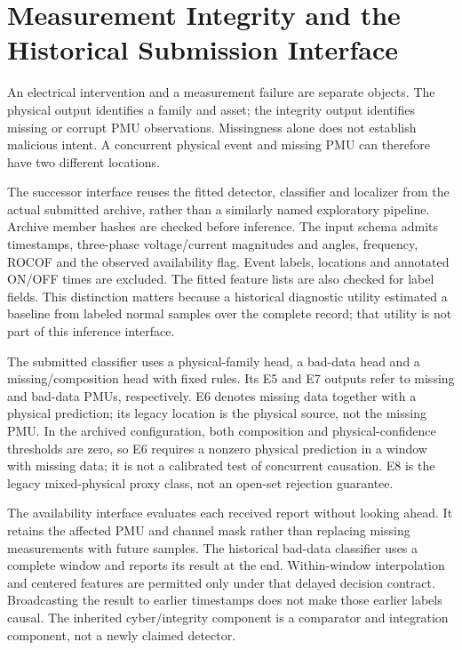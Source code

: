 \section{Measurement Integrity and the Historical Submission Interface}
\label{app:integrity-interface}

An electrical intervention and a measurement failure are separate objects.
The physical output identifies a family and asset; the integrity output
identifies missing or corrupt PMU observations. Missingness alone does not
establish malicious intent. A concurrent physical event and missing PMU can
therefore have two different locations.

The successor interface reuses the fitted detector, classifier and localizer
from the actual submitted archive, rather than a similarly named exploratory
pipeline. Archive member hashes are checked before inference. The input
schema admits timestamps, three-phase voltage/current magnitudes and angles,
frequency, ROCOF and the observed availability flag. Event labels, locations
and annotated ON/OFF times are excluded. The fitted feature lists are also
checked for label fields. This distinction matters because a historical
diagnostic utility estimated a baseline from labeled normal samples over
the complete record; that utility is not part of this inference interface.

The submitted classifier uses a physical-family head, a bad-data head and a
missing/composition head with fixed rules. Its E5 and E7 outputs refer to
missing and bad-data PMUs, respectively. E6 denotes missing data together
with a physical prediction; its legacy location is the physical source,
not the missing PMU. In the archived configuration, both composition and
physical-confidence thresholds are zero, so E6 requires a nonzero physical
prediction in a window with missing data; it is not a calibrated test of
concurrent causation. E8 is the legacy mixed-physical proxy class, not an
open-set rejection guarantee.

The availability interface evaluates each received report without looking
ahead. It retains the affected PMU and channel mask rather than replacing
missing measurements with future samples. The historical bad-data classifier
uses a complete window and reports its result at the end. Within-window
interpolation and centered features are permitted only under that delayed
decision contract. Broadcasting the result to earlier timestamps does not
make those earlier labels causal. The inherited cyber/integrity component
is a comparator and integration component, not a newly claimed detector.

